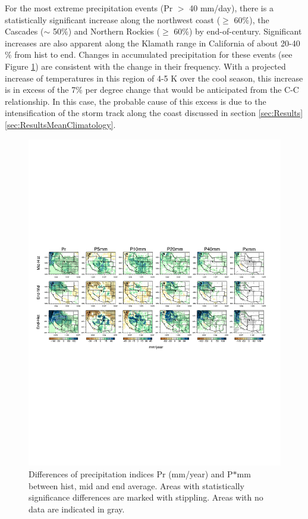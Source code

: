 For the most extreme precipitation events (Pr $>$ 40 mm/day), there is a statistically significant increase along the northwest coast ($\geq$ 60$\%$), the Cascades ($\sim$ 50$\%$) and Northern Rockies ($\geq$ 60$\%$) by end-of-century. Significant increases are also apparent along the Klamath range in California of about 20-40$\%$ from \textsf{hist} to \textsf{end}. Changes in accumulated precipitation for these events (see Figure \ref{fig:difIndex2}) are consistent with the change in their frequency.  With a projected increase of temperatures in this region of 4-5 K over the cool season, this increase is in excess of the 7\% per degree change that would be anticipated from the C-C relationship.  In this case, the probable cause of this excess is due to the intensification of the storm track along the coast discussed in section \ref{sec:Results}\ref{sec:ResultsMeanClimatology}.

\begin{figure}
\begin{center}
\includegraphics[width=8in, trim={0.6cm 9.5cm 1.0cm 9.0cm},clip]{wd_index_all_years_part2.pdf}
\caption{Differences of precipitation indices Pr (mm/year) and P$\ast$mm between \textsf{hist}, \textsf{mid} and \textsf{end} average.  Areas with statistically significance differences are marked with stippling.  Areas with no data are indicated in gray.}
\label{fig:difIndex2}
\end{center}
\end{figure}


